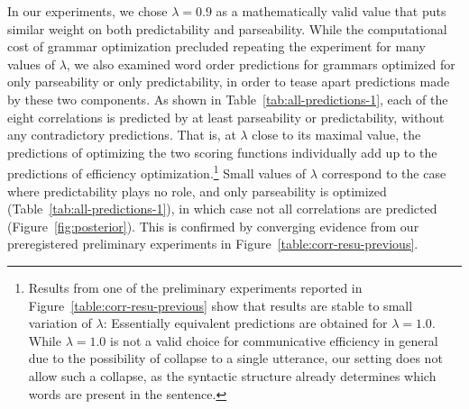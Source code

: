 \documentclass[10pt,twoside,lineno]{article}
\begin{document}
In our experiments, we chose $\lambda = 0.9$ as a mathematically valid value that puts similar weight on both predictability and parseability.
While the computational cost of grammar optimization precluded repeating the experiment for many values of $\lambda$, we also examined word order predictions for grammars optimized for only parseability or only predictability, in order to tease apart predictions made by these two components.
As shown in Table~\ref{tab:all-predictions-1}, each of the eight correlations is predicted by at least parseability or predictability, without any contradictory predictions.
That is, at $\lambda$ close to its maximal value, the predictions of optimizing the two scoring functions individually add up to the predictions of efficiency optimization.\footnote{Results from one of the preliminary experiments reported in Figure~\ref{table:corr-resu-previous} show that results are stable to small variation of $\lambda$: Essentially equivalent predictions are obtained for $\lambda=1.0$. While $\lambda=1.0$ is not a valid choice for communicative efficiency in general due to the possibility of collapse to a single utterance, our setting does not allow such a collapse, as the syntactic structure already determines which words are present in the sentence.}
Small values of $\lambda$ correspond to the case where predictability plays no role, and only parseability is optimized (Table~\ref{tab:all-predictions-1}), in which case not all correlations are predicted (Figure~\ref{fig:posterior}).
This is confirmed by converging evidence from our preregistered preliminary experiments in Figure~\ref{table:corr-resu-previous}.











\end{document}
